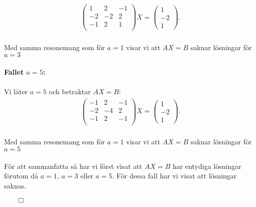 \documentclass{article}
\begin{document}
\begin{gather*}
  \begin{pmatrix}
    1 & 2 & -1 \\
    -2 & -2 & 2 \\
    -1 & 2 & 1\\
  \end{pmatrix}
  X =
  \begin{pmatrix}
    1 \\ -2 \\ 1
  \end{pmatrix}\text{.}
\end{gather*}
\\
Med samma resonemang som för $a = 1$ visar vi att $AX = B$ saknar lösningar för $a = 3$
\\
\\
\textbf{Fallet $a = 5$:}
\\
\\
Vi låter $a = 5$ och betraktar $AX = B$:
\begin{gather*}
  \begin{pmatrix}
    -1 & 2 & -1 \\
    -2 & -4 & 2 \\
    -1 & 2 & -1\\
  \end{pmatrix}
  X =
  \begin{pmatrix}
    1 \\ -2 \\ 1
  \end{pmatrix}\text{.}
\end{gather*}
\\
Med samma resonemang som för $a = 1$ visar vi att $AX = B$ saknar lösningar för $a = 5$
\\
\\
För att sammanfatta så har vi först visat att $AX = B$ har entydiga lösningar förutom då $a = 1$, $a = 3$ eller $a =5$. För dessa fall har vi visat att lösningar saknas.
\\
\centerline{$\qed$}
\end{document}
